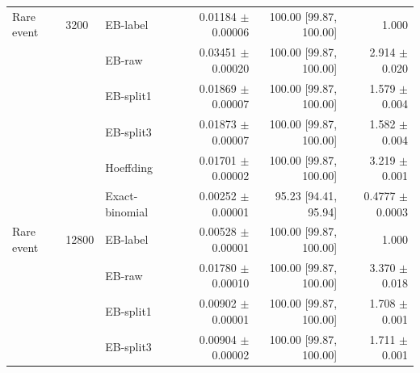 \begin{longtable}{lllrrr}
Rare event & 3200 & EB-label & 0.01184 $\pm$ 0.00006 & 100.00 [99.87, 100.00] & 1.000 \\
 &  & EB-raw & 0.03451 $\pm$ 0.00020 & 100.00 [99.87, 100.00] & 2.914 $\pm$ 0.020 \\
 &  & EB-split1 & 0.01869 $\pm$ 0.00007 & 100.00 [99.87, 100.00] & 1.579 $\pm$ 0.004 \\
 &  & EB-split3 & 0.01873 $\pm$ 0.00007 & 100.00 [99.87, 100.00] & 1.582 $\pm$ 0.004 \\
 &  & Hoeffding & 0.01701 $\pm$ 0.00002 & 100.00 [99.87, 100.00] & 3.219 $\pm$ 0.001 \\
 &  & Exact-binomial & 0.00252 $\pm$ 0.00001 & 95.23 [94.41, 95.94] & 0.4777 $\pm$ 0.0003 \\
Rare event & 12800 & EB-label & 0.00528 $\pm$ 0.00001 & 100.00 [99.87, 100.00] & 1.000 \\
 &  & EB-raw & 0.01780 $\pm$ 0.00010 & 100.00 [99.87, 100.00] & 3.370 $\pm$ 0.018 \\
 &  & EB-split1 & 0.00902 $\pm$ 0.00001 & 100.00 [99.87, 100.00] & 1.708 $\pm$ 0.001 \\
 &  & EB-split3 & 0.00904 $\pm$ 0.00002 & 100.00 [99.87, 100.00] & 1.711 $\pm$ 0.001 \\
\bottomrule
\end{longtable}
\endgroup
